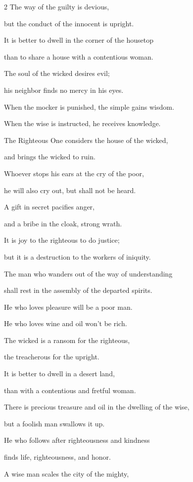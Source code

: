 \begin{multicols}{2}
\myverse{}The way of the guilty is devious,

but the conduct of the innocent is upright.


\myverse{}It is better to dwell in the corner of the housetop

than to share a house with a contentious woman.


\myverse{}The soul of the wicked desires evil;

his neighbor finds no mercy in his eyes.


\myverse{}When the mocker is punished, the simple gains wisdom.

When the wise is instructed, he receives knowledge.


\myverse{}The Righteous One considers the house of the wicked,

and brings the wicked to ruin.


\myverse{}Whoever stops his ears at the cry of the poor,

he will also cry out, but shall not be heard.


\myverse{}A gift in secret pacifies anger,

and a bribe in the cloak, strong wrath.


\myverse{}It is joy to the righteous to do justice;

but it is a destruction to the workers of iniquity.


\myverse{}The man who wanders out of the way of understanding

shall rest in the assembly of the departed spirits.


\myverse{}He who loves pleasure will be a poor man.

He who loves wine and oil won’t be rich.


\myverse{}The wicked is a ransom for the righteous,

the treacherous for the upright.


\myverse{}It is better to dwell in a desert land,

than with a contentious and fretful woman.


\myverse{}There is precious treasure and oil in the dwelling of the wise,

but a foolish man swallows it up.


\myverse{}He who follows after righteousness and kindness

finds life, righteousness, and honor.


\myverse{}A wise man scales the city of the mighty,


\end{multicols}

